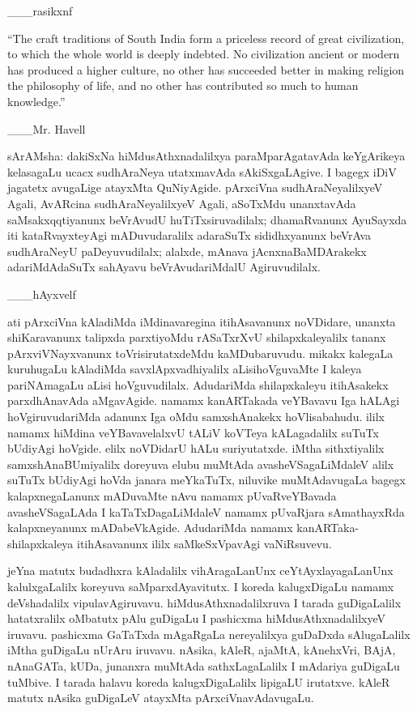 \documentclass[11pt,a4size]{article}
\begin{document}
\hfill \_\_\_rasikxnf

\medskip
{
\rm

``The craft traditions of South India form a priceless record of great
civilization, to which the whole world is deeply indebted. No
civilization ancient or modern has produced a higher culture, no other
has succeeded better in making religion the philosophy of life, and no
other has contributed so much to human knowledge.''

\hfill \_\_\_Mr. Havell}

\medskip
sArAMsha: dakiSxNa hiMdusAthxnadalilxya paraMparAgatavAda keYgArikeya
kelasagaLu ucacx sudhAraNeya utatxmavAda sAkiSxgaLAgive. I bagegx iDiV
jagatetx avugaLige atayxMta QuNiyAgide. pArxciVna sudhAraNeyalilxyeV
Agali, AvARcina sudhAraNeyalilxyeV Agali, aSoTxMdu unanxtavAda
saMsakxqqtiyanunx beVrAvudU huTiTxsiruvadilalx; dhamaRvanunx AyuSayxda
iti kataRvayxteyAgi mADuvudaralilx adaraSuTx sididhxyanunx beVrAva
sudhAraNeyU paDeyuvudilalx; alalxde, mAnava jAcnxnaBaMDArakekx
adariMdAdaSuTx sahAyavu beVrAvudariMdalU Agiruvudilalx.

\hfill \_\_\_hAyxvelf

\medskip
ati pArxciVna kAladiMda iMdinavaregina itihAsavanunx noVDidare,
unanxta shiKaravanunx talipxda parxtiyoMdu rASaTxrXvU
shilapxkaleyalilx tananx pArxviVNayxvanunx toVrisirutatxdeMdu
kaMDubaruvudu. mikakx kalegaLa kuruhugaLu kAladiMda
savxlApxvadhiyalilx aLisihoVguvaMte I kaleya pariNAmagaLu aLisi
hoVguvudilalx. AdudariMda shilapxkaleyu itihAsakekx parxdhAnavAda
aMgavAgide. namamx kanARTakada veYBavavu Iga hALAgi hoVgiruvudariMda
adanunx Iga oMdu samxshAnakekx hoVlisabahudu. ililx namamx hiMdina
veYBavavelalxvU tALiV koVTeya kALagadalilx suTuTx bUdiyAgi
hoVgide. elilx noVDidarU hALu suriyutatxde. iMtha sithxtiyalilx
samxshAnaBUmiyalilx doreyuva elubu muMtAda avasheVSagaLiMdaleV alilx
suTuTx bUdiyAgi hoVda janara meYkaTuTx, niluvike muMtAdavugaLa bagegx
kalapxnegaLanunx mADuvaMte nAvu namamx pUvaRveYBavada avasheVSagaLAda
I kaTaTxDagaLiMdaleV namamx pUvaRjara sAmathayxRda kalapxneyanunx
mADabeVkAgide. AdudariMda namamx kanARTaka-shilapxkaleya itihAsavanunx
ililx saMkeSxVpavAgi vaNiRsuvevu.

jeYna matutx budadhxra kAladalilx vihAragaLanUnx ceYtAyxlayagaLanUnx
kalulxgaLalilx koreyuva saMparxdAyavitutx. I koreda kalugxDigaLu
namamx deVshadalilx vipulavAgiruvavu. hiMdusAthxnadalilxruva I tarada
guDigaLalilx hatatxralilx oMbatutx pAlu guDigaLu I pashicxma
hiMdusAthxnadalilxyeV iruvavu. pashicxma GaTaTxda mAgaRgaLa
nereyalilxya guDaDxda sAlugaLalilx iMtha guDigaLu nUrAru
iruvavu. nAsika, kAleR, ajaMtA, kAnehxVri, BAjA, nAnaGATa, kUDa,
junanxra muMtAda sathxLagaLalilx I mAdariya guDigaLu tuMbive. I tarada
halavu koreda kalugxDigaLalilx lipigaLU irutatxve. kAleR matutx nAsika
guDigaLeV atayxMta pArxciVnavAdavugaLu.
\end{document}
